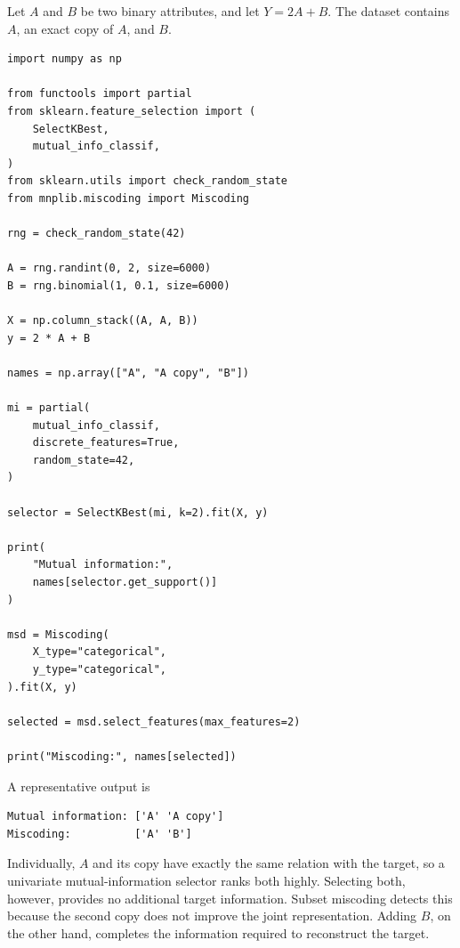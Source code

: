 \begin{example}
Let $A$ and $B$ be two binary attributes, and let $Y=2A+B$. The dataset contains $A$, an exact copy of $A$, and $B$.

\begin{sourcecode}
{\scriptsize \begin{verbatim}
import numpy as np

from functools import partial
from sklearn.feature_selection import (
    SelectKBest,
    mutual_info_classif,
)
from sklearn.utils import check_random_state
from mnplib.miscoding import Miscoding

rng = check_random_state(42)

A = rng.randint(0, 2, size=6000)
B = rng.binomial(1, 0.1, size=6000)

X = np.column_stack((A, A, B))
y = 2 * A + B

names = np.array(["A", "A copy", "B"])

mi = partial(
    mutual_info_classif,
    discrete_features=True,
    random_state=42,
)

selector = SelectKBest(mi, k=2).fit(X, y)

print(
    "Mutual information:",
    names[selector.get_support()]
)

msd = Miscoding(
    X_type="categorical",
    y_type="categorical",
).fit(X, y)

selected = msd.select_features(max_features=2)

print("Miscoding:", names[selected])
\end{verbatim}}
\end{sourcecode}

A representative output is

\begin{sourcecode}
{\scriptsize \begin{verbatim}
Mutual information: ['A' 'A copy']
Miscoding:          ['A' 'B']
\end{verbatim}}
\end{sourcecode}

Individually, $A$ and its copy have exactly the same relation with the target, so a univariate mutual-information selector ranks both highly. Selecting both, however, provides no additional target information. Subset miscoding detects this because the second copy does not improve the joint representation. Adding $B$, on the other hand, completes the information required to reconstruct the target.
\end{example}

